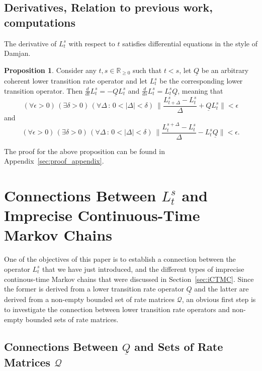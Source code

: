 \documentclass[10pt]{paper}
\theoremstyle{definition}
\newtheorem{proposition}[theorem]{Proposition}
\newcommand{\reals}{\mathbb{R}}
\newcommand{\realsnonneg}{\reals_{\geq 0}}
\newcommand{\lbound}{L}
\newcommand{\rateset}{\mathcal{Q}}
\newcommand{\lrate}{\underline{Q}}
\begin{document}
\subsection{Derivatives, Relation to previous work, computations}

The derivative of $\lbound_t^s$ with respect to $t$ satisfies differential equations in the style of Damjan.

\begin{proposition}\label{prop:lower_transition_has_deriv}
Consider any $t,s\in\realsnonneg$ such that $t<s$, let $\lrate$ be an arbitrary coherent lower transition rate operator and let $\lbound_t^s$ be the corresponding lower transition operator. Then $\frac{d}{dt}\lbound_t^s=-\lrate\lbound_t^s$ and $\frac{d}{ds}\lbound_t^s=\lbound_t^s\lrate$, meaning that
\begin{equation}\label{eq:lower_deriv_backward}
(\forall\epsilon>0)\,
(\exists\delta>0)\,
(\forall\Delta\,:\,0<\lvert\Delta\rvert <\delta)~
\Big\lVert\frac{L_{t+\Delta}^s-L_t^s}{\Delta}+\lrate L_t^s\Big\rVert<\epsilon
\end{equation}
and
\begin{equation}\label{eq:lower_deriv_forward}
(\forall\epsilon>0)\,
(\exists\delta>0)\,
(\forall\Delta\,:\,0<\lvert\Delta\rvert<\delta)~
\Big\lVert\frac{L_{t}^{s+\Delta}-L_t^s}{\Delta}-\lbound_t^s\lrate \Big\rVert<\epsilon.
\end{equation}
\end{proposition}
\noindent The proof for the above proposition can be found in Appendix~\ref{sec:proof_appendix}.

\section{Connections Between $L_t^s$ and Imprecise Continuous-Time Markov Chains}

One of the objectives of this paper is to establish a connection between the operator $\lbound_t^s$ that we have just introduced, and the different types of imprecise continous-time Markov chains that were discussed in Section~\ref{sec:iCTMC}. Since the former is derived from a lower transition rate operator $\lrate$ and the latter are derived from a non-empty bounded set of rate matrices $\rateset$, an obvious first step is to investigate the connection between lower transition rate operators and non-empty bounded sets of rate matrices.

\subsection{Connections Between $\lrate$ and Sets of Rate Matrices $\rateset$}
\end{document}
